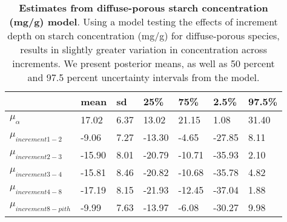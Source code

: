 \documentclass{article}\usepackage[]{graphicx}\usepackage[]{color}
\begin{document}
\begin{table}[ht]
\centering
\caption{\textbf{Estimates from diffuse-porous starch concentration (mg/g) model}. Using a model testing the effects of increment depth on starch concentration (mg/g) for diffuse-porous species, results in slightly greater variation in concentration across increments. We present posterior means, as well as 50 percent and 97.5 percent uncertainty intervals from the model.} 
\label{tab:diffstar}
\begingroup\footnotesize
\begin{tabular}{|p{}|p{}|p{}|p{}|p{}|p{}|p{}|}
  \hline
 & mean & sd & 25\% & 75\% & 2.5\% & 97.5\% \\ 
  \hline
$\mu_{\alpha}$ & 17.02 & 6.37 & 13.02 & 21.15 & 1.08 & 31.40 \\ 
  $\mu_{increment 1-2}$ & -9.06 & 7.27 & -13.30 & -4.65 & -27.85 & 8.11 \\ 
  $\mu_{increment 2-3}$ & -15.90 & 8.01 & -20.79 & -10.71 & -35.93 & 2.10 \\ 
  $\mu_{increment 3-4}$ & -15.81 & 8.46 & -20.82 & -10.68 & -35.78 & 4.82 \\ 
  $\mu_{increment 4-8}$ & -17.19 & 8.15 & -21.93 & -12.45 & -37.04 & 1.88 \\ 
  $\mu_{increment 8-pith}$ & -9.99 & 7.63 & -13.97 & -6.08 & -30.27 & 9.98 \\ 
   \hline
\end{tabular}
\endgroup
\end{table}
\end{document}
